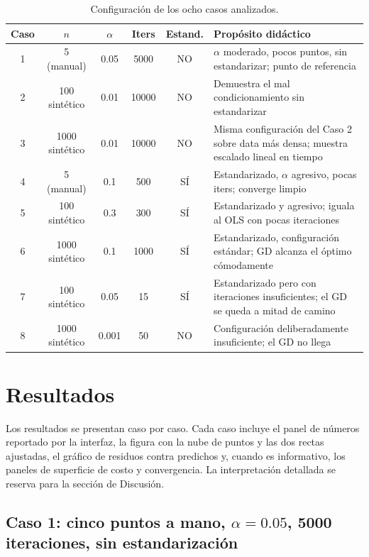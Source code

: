 \documentclass[11pt,a4paper]{article}
\begin{document}
\begin{table}[H]
\centering
\caption{Configuración de los ocho casos analizados.}
\label{tab:casos}
\small
\begin{tabularx}{\textwidth}{c c c c c X}
\toprule
\textbf{Caso} & \textbf{$n$} & \textbf{$\alpha$} & \textbf{Iters} & \textbf{Estand.} & \textbf{Propósito didáctico} \\
\midrule
1 & 5 (manual) & 0.05 & 5000 & NO & $\alpha$ moderado, pocos puntos, sin estandarizar; punto de referencia \\
2 & 100 sintético & 0.01 & 10000 & NO & Demuestra el mal condicionamiento sin estandarizar \\
3 & 1000 sintético & 0.01 & 10000 & NO & Misma configuración del Caso 2 sobre data más densa; muestra escalado lineal en tiempo \\
4 & 5 (manual) & 0.1 & 500 & SÍ & Estandarizado, $\alpha$ agresivo, pocas iters; converge limpio \\
5 & 100 sintético & 0.3 & 300 & SÍ & Estandarizado y agresivo; iguala al OLS con pocas iteraciones \\
6 & 1000 sintético & 0.1 & 1000 & SÍ & Estandarizado, configuración estándar; GD alcanza el óptimo cómodamente \\
7 & 100 sintético & 0.05 & 15 & SÍ & Estandarizado pero con iteraciones insuficientes; el GD se queda a mitad de camino \\
8 & 1000 sintético & 0.001 & 50 & NO & Configuración deliberadamente insuficiente; el GD no llega \\
\bottomrule
\end{tabularx}
\end{table}

\section{Resultados}

Los resultados se presentan caso por caso. Cada caso incluye el panel de números reportado por la interfaz, la figura con la nube de puntos y las dos rectas ajustadas, el gráfico de residuos contra predichos y, cuando es informativo, los paneles de superficie de costo y convergencia. La interpretación detallada se reserva para la sección de Discusión.

\subsection{Caso 1: cinco puntos a mano, $\alpha = 0.05$, 5000 iteraciones, sin estandarización}
\end{document}
